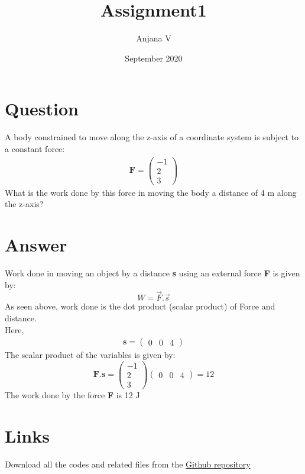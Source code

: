 \documentclass{article}
\title{Assignment1}
\author{Anjana V }
\date{September 2020}
\begin{document}
\maketitle
\section*{Question}
A body constrained to move along the z-axis of a coordinate system is subject to a constant force:
\begin{align*}
\textbf{F}=\begin{pmatrix}
-1\\
2\\
3
\end{pmatrix}    
\end{align*}
What is the work done by this force in moving the body a distance of 4 m along the z-axis?
\section*{Answer}
Work done in moving an object by a distance \textbf{s} using an external force \textbf{F} is given by:
$$W=\vec{F} . \vec{s}$$
As seen above, work done is the dot product (scalar product) of Force and distance.
\\Here, 
\begin{align*}
\textbf{s}=\begin{pmatrix}
0 & 0 & 4
\end{pmatrix}    
\end{align*}
The scalar product of the variables is given by:
$$\textbf{F}.\textbf{s} = \begin{pmatrix}
-1\\
2\\
3
\end{pmatrix}\begin{pmatrix}
0 & 0 & 4
\end{pmatrix}=12$$
The work done by the force \textbf{F} is 12 J
\section*{Links}
Download all the codes and related files from the \href{}{Github repository} 
\end{document}
